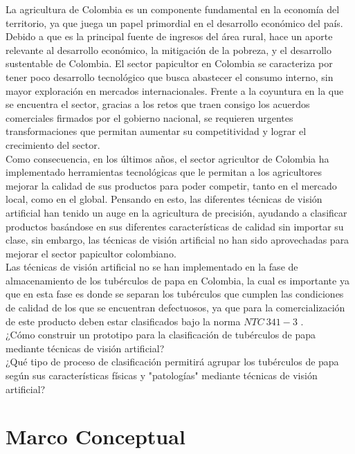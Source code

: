 La agricultura de Colombia es un componente fundamental en la economía del territorio, ya que juega un papel primordial en el desarrollo económico del país. Debido a que es la principal fuente de ingresos del área rural, hace un aporte relevante al desarrollo económico, la mitigación de la pobreza, y el desarrollo sustentable de Colombia. El sector papicultor en Colombia se caracteriza por tener poco desarrollo tecnológico que busca abastecer el consumo interno, sin mayor exploración en mercados internacionales. Frente a la coyuntura en la que se encuentra el sector, gracias a los retos que traen consigo los acuerdos comerciales firmados por el gobierno nacional, se requieren urgentes transformaciones que permitan aumentar su competitividad y lograr el crecimiento del sector.\\

Como consecuencia, en los últimos años, el sector agricultor de Colombia ha implementado herramientas tecnológicas que le permitan a los agricultores mejorar la calidad de sus productos para poder competir, tanto en el mercado local, como en el global. Pensando en esto, las diferentes técnicas de visión artificial han tenido un auge en la agricultura de precisión, ayudando a clasificar productos basándose en sus diferentes características de calidad sin importar su clase, sin embargo, las técnicas de visión artificial no han sido aprovechadas para mejorar el sector papicultor colombiano.\\

Las técnicas de visión artificial no se han implementado en la fase de almacenamiento de los tubérculos de papa en Colombia, la cual es importante ya que en esta fase es donde se separan los tubérculos que cumplen las condiciones de calidad de los que se encuentran defectuosos, ya que para la comercialización de este producto deben estar clasificados bajo la norma $NTC \ 341-3$ \cite{ntc341}.\\

¿Cómo construir un prototipo para la clasificación de tubérculos de papa mediante técnicas de visión artificial?\\

¿Qué tipo de proceso de clasificación permitirá agrupar los tubérculos de papa según sus características físicas y "patologías" mediante técnicas de visión artificial?	


\chapter{Marco Conceptual}

